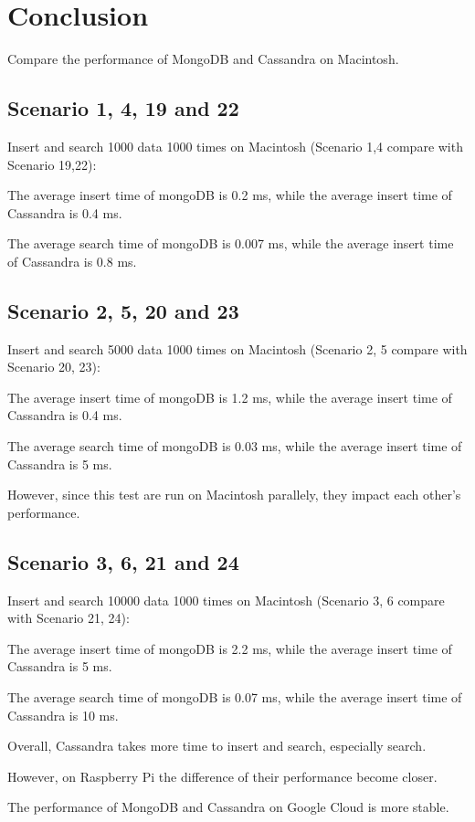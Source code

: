 \section{Conclusion}
Compare the performance of MongoDB and Cassandra on Macintosh. 

\subsection{Scenario 1, 4, 19 and 22}
Insert and search 1000 data 1000 times on Macintosh 
(Scenario 1,4 compare with Scenario 19,22):

The average insert time of mongoDB is 0.2 ms, while the average insert time of 
Cassandra is 0.4 ms.

The average search time of mongoDB is 0.007 ms, while the average
 insert time of Cassandra is 0.8 ms.

\subsection{Scenario 2, 5, 20 and 23}
Insert and search 5000 data 1000 times on Macintosh 
(Scenario 2, 5 compare with Scenario 20, 23):

The average insert time of mongoDB is 1.2 ms, while the average insert time of 
Cassandra is 0.4 ms.

The average search time of mongoDB is 0.03 ms, while the average 
insert time of 
Cassandra is 5 ms.

However, since this test are run on Macintosh parallely, they impact each other's 
performance.

\subsection{Scenario 3, 6, 21 and 24}
Insert and search 10000 data 1000 times on Macintosh 
(Scenario 3, 6 compare with Scenario 21, 24):

The average insert time of mongoDB is 2.2 ms, while the average insert time of 
Cassandra is 5 ms.

The average search time of mongoDB is 0.07 ms, while the average insert
 time of 
Cassandra is 10 ms.

Overall, Cassandra takes more time to insert and search, especially search. 

However, on Raspberry Pi the difference of their performance become closer.

The performance of MongoDB and Cassandra on Google Cloud is more stable.



